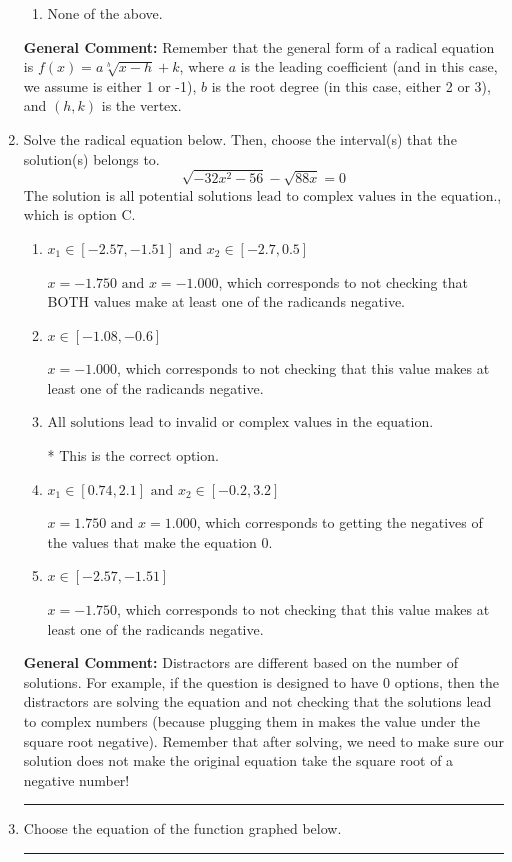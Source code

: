 \documentclass{extbook}[14pt]
\newcommand{\litem}[1]{\item #1

\rule{\textwidth}{0.4pt}}
\begin{document}
\begin{enumerate}
{\begin{enumerate}[label=\Alph*.]
\begin{multicols}{2}
\end{multicols}\item None of the above.\end{enumerate}
\textbf{General Comment:} Remember that the general form of a radical equation is $ f(x) = a \sqrt[b]{x - h} + k $, where $a$ is the leading coefficient (and in this case, we assume is either 1 or -1), $b$ is the root degree (in this case, either 2 or 3), and $(h, k)$ is the vertex.
}
\litem{
Solve the radical equation below. Then, choose the interval(s) that the solution(s) belongs to.
\[ \sqrt{-32 x^2 - 56} - \sqrt{88 x} = 0 \]The solution is \( \text{all potential solutions lead to complex values in the equation.} \), which is option C.\begin{enumerate}[label=\Alph*.]
\item \( x_1 \in [-2.57, -1.51] \text{ and } x_2 \in [-2.7,0.5] \)

$x = -1.750 \text{ and } x = -1.000$, which corresponds to not checking that BOTH values make at least one of the radicands negative.
\item \( x \in [-1.08,-0.6] \)

$x = -1.000$, which corresponds to not checking that this value makes at least one of the radicands negative.
\item \( \text{All solutions lead to invalid or complex values in the equation.} \)

* This is the correct option.
\item \( x_1 \in [0.74, 2.1] \text{ and } x_2 \in [-0.2,3.2] \)

$x = 1.750 \text{ and } x = 1.000$, which corresponds to getting the negatives of the values that make the equation 0.
\item \( x \in [-2.57,-1.51] \)

$x = -1.750$, which corresponds to not checking that this value makes at least one of the radicands negative.
\end{enumerate}

\textbf{General Comment:} Distractors are different based on the number of solutions. For example, if the question is designed to have 0 options, then the distractors are solving the equation and not checking that the solutions lead to complex numbers (because plugging them in makes the value under the square root negative). Remember that after solving, we need to make sure our solution does not make the original equation take the square root of a negative number!
}
\litem{
Choose the equation of the function graphed below.

}
\end{enumerate}
\end{document}

